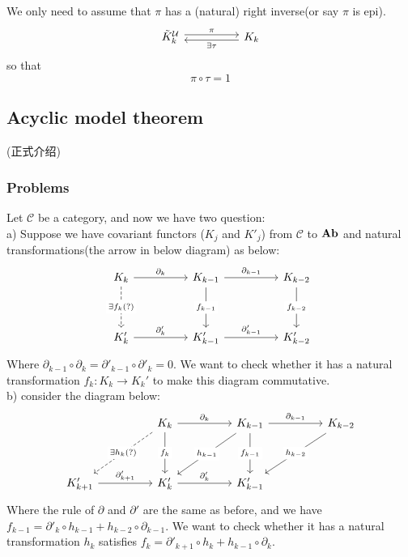 \documentclass{article}
\begin{document}
\begin{remark}
    We only need to assume that $\pi$ has a (natural) right inverse(or say $\pi$ is epi).
    \[\begin{tikzcd}
        {\tilde{K}_k^\mathcal{U}} && {K_k}
        \arrow["\pi", shift left, from=1-1, to=1-3]
        \arrow["{\exists \tau}", shift left, from=1-3, to=1-1]
    \end{tikzcd}\]
    so that 
    $$
    \pi \circ \tau = 1
    $$ 
\end{remark}
\subsection{Acyclic model theorem}(正式介绍)
\subsubsection{Problems}
Let $\mathscr{C}$ be a category, and now we have two question:\\
a) Suppose we have covariant functors ($K_j$ and $K'_j$) from $\mathscr{C}$ to $\bold{Ab}$ and natural transformations(the arrow in below diagram) as below:
\[\begin{tikzcd}
	{K_k} && {K_{k-1}} && {K_{k-2}} \\
	\\
	{K'_k} && {K'_{k-1}} && {K'_{k-2}}
	\arrow["{\partial_k}", from=1-1, to=1-3]
	\arrow["{\partial_{k-1}}", from=1-3, to=1-5]
	\arrow["{\partial'_k}", from=3-1, to=3-3]
	\arrow["{\partial_{k-1}'}", from=3-3, to=3-5]
	\arrow["{f_{k-1}}"{description}, from=1-3, to=3-3]
	\arrow["{f_{k-2}}"{description}, from=1-5, to=3-5]
	\arrow["{\exists f_k(?)}"{description}, dashed, from=1-1, to=3-1]
\end{tikzcd}\]
Where $\partial_{k-1} \circ \partial_k = \partial'_{k-1} \circ \partial'_k = 0$.
We want to check whether it has a natural transformation $f_k:K_k \to K_k'$ to make this diagram commutative.\\
b) consider the diagram below:
\[\begin{tikzcd}
	&& {K_k} && {K_{k-1}} && {K_{k-2}} \\
	\\
	{K'_{k+1}} && {K'_k} && {K'_{k-1}}
	\arrow["{\partial'_{k+1}}", from=3-1, to=3-3]
	\arrow["{\partial_k'}", from=3-3, to=3-5]
	\arrow["{\partial_k}", from=1-3, to=1-5]
	\arrow["{\partial_{k-1}}", from=1-5, to=1-7]
	\arrow["{f_k}"{description}, from=1-3, to=3-3]
	\arrow["{f_{k-1}}"{description}, from=1-5, to=3-5]
	\arrow["{h_{k-2}}"{description}, from=1-7, to=3-5]
	\arrow["{h_{k-1}}"{description}, from=1-5, to=3-3]
	\arrow["{\exists h_k(?)}"{description}, dashed, from=1-3, to=3-1]
\end{tikzcd}\]
Where the rule of $\partial$ and $\partial'$ are the same as before, and we have $f_{k-1} = \partial'_k \circ h_{k-1} +  h_{k-2}\circ \partial_{k-1}$. We want to check whether it has a natural transformation $h_k$ satisfies $f_k = \partial'_{k+1}\circ h_k + h_{k-1}\circ \partial_k$.
\end{document}
